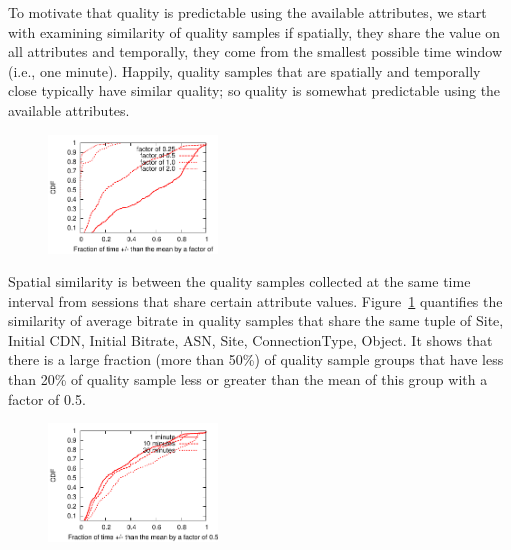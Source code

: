 To motivate that quality is predictable using the available attributes, we start with examining similarity of quality samples if spatially, they share the value on all attributes and temporally, they come from the smallest possible time window (i.e., one minute).
Happily, quality samples that are spatially and temporally close typically have similar quality; so quality is somewhat predictable using the available attributes.

\begin{figure}[h!]
\centering
 \includegraphics[width=0.4\textwidth] {figures/spatial-similarity.pdf}
\label{fig:spatial-similarity}
\end{figure}

 Spatial similarity is between the quality samples collected at the same time interval from sessions that share certain attribute values.  Figure~\ref{fig:spatial-similarity} quantifies the similarity of average bitrate in quality samples that share the same tuple of Site, Initial CDN, Initial Bitrate, ASN, Site, ConnectionType, Object. It shows that there is a large fraction (more than 50\%) of quality sample groups that have less than 20\% of quality sample less or greater than the mean of this group with a factor of 0.5.

\begin{figure}[h!]
\centering
 \includegraphics[width=0.4\textwidth] {figures/temporal-similarity.pdf}
\label{fig:temporal-similarity}
\end{figure}

